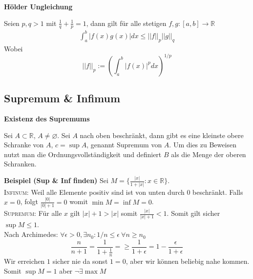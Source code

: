 \documentclass[25pt]{sciposter}
\newcommand{\R}{\mathbb{R}}
\newenvironment{method}[1]{\begin{mdframed}[backgroundcolor=blue!10,innertopmargin=15pt, innerbottommargin=15pt, nobreak=true]
		\textbf{#1 }
	}
	{ 
	\end{mdframed}
}
\begin{document}
\begin{multicols}{3}
\begin{method}{Hölder Ungleichung}
	Seien $p,q>1$ mit $\frac{1}{q} + \frac{1}{p} = 1$, dann gilt für alle stetigen $f,g:[a,b]\to \R$
	\begin{align*}
		\int_{a}^{b} |f(x) g(x)| dx \leq || f||_p ||g||_q
	\end{align*}
	Wobei $$||f||_p := \left( \int_{a}^{b} |f(x) |^p dx \right) ^{1/p}$$
\end{method}

\subsection*{Supremum \& Infimum}

\begin{method}{Existenz des Supremums}
Sei $A \subset \R$, $A \not = \varnothing$. Sei $A$ nach oben beschränkt, dann gibt es eine kleinste obere Schranke von $A$, $c = \sup A$, genannt Supremum von $A$. Um dies zu Beweisen nutzt man die Ordnungsvollständigkeit und definiert $B$ als die Menge der oberen Schranken.
\end{method}
\textbf{Beispiel (Sup \& Inf finden)} Sei $M = \{ \frac{|x|}{1 + |x|} : x \in \mathbb{R}\}$. \\ \textsc{Infinum:} Weil alle Elemente positiv sind ist von unten durch 0 beschränkt. Falls $x = 0$, folgt $\frac{|0|}{|0|+1} =0$ womit $\min{M} = \inf{M} = 0$. \\
\textsc{Supremum:} Für alle $x$ gilt $|x| + 1 > |x|$ somit $\frac{|x|}{|x|+1} < 1$. Somit gilt sicher $\sup M \leq 1$. \\
Nach Archimedes: $\forall \epsilon > 0,\exists n_0 : 1/n \leq \epsilon \ \forall n \geq n_0$
$$\frac{n}{n+1} = \frac{1}{1 + \frac{1}{n}} =\geq \frac{1}{1 + \epsilon} = 1 - \frac{\epsilon}{1 + \epsilon}$$
Wir erreichen $1$ sicher nie da sonst $1 = 0$, aber wir können beliebig nahe kommen. Somit $\sup M = 1$ aber $\neg \exists \max M$




\end{multicols}
\end{document}
